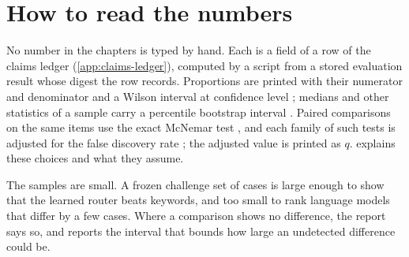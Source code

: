 
\section{How to read the numbers}

No number in the chapters is typed by hand. Each is a field of a row of the claims ledger
(\cref{app:claims-ledger}), computed by a script from a stored evaluation result whose digest the row records.
Proportions are printed with their numerator and denominator and a Wilson interval at confidence level
 \parencite{wilson1927}; medians and other statistics of a sample carry a percentile bootstrap interval
\parencite{efron1979}. Paired comparisons on the same items use the exact McNemar test \parencite{mcnemar1947}, and
each family of such tests is adjusted for the false discovery rate \parencite{benjamini1995}; the adjusted value is
printed as $q$.  explains these choices and what they assume.

The samples are small. A frozen challenge set of  cases is large enough to show that the
learned router beats keywords, and too small to rank language models that differ by a few cases. Where a
comparison shows no difference, the report says so, and reports the interval that bounds how large an undetected
difference could be.
